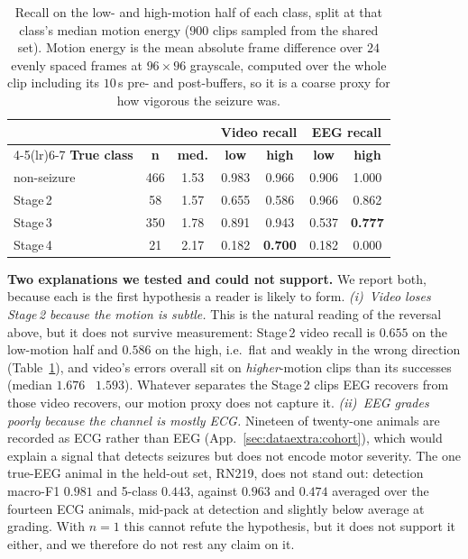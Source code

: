\begin{table}[tb]
\centering
\caption{Recall on the low- and high-motion half of each class, split at that class's
median motion energy ($900$ clips sampled from the shared set). Motion energy is the
mean absolute frame difference over $24$ evenly spaced frames at $96\times96$
grayscale, computed over the whole clip including its $10$\,s pre- and post-buffers,
so it is a coarse proxy for how vigorous the seizure was.}
\label{tab:motion}
\setlength{\tabcolsep}{4pt}
\renewcommand{\arraystretch}{1.15}
\begin{tabular}{@{}l c c cc cc@{}}
\toprule
 & & & \multicolumn{2}{c}{\textbf{Video recall}} & \multicolumn{2}{c}{\textbf{EEG recall}} \\
\cmidrule(lr){4-5}\cmidrule(lr){6-7}
\textbf{True class} & \textbf{n} & \textbf{med.} & \textbf{low} & \textbf{high} & \textbf{low} & \textbf{high} \\
\midrule
non-seizure & 466 & 1.53 & 0.983 & 0.966 & 0.906 & 1.000 \\
Stage\,2    &  58 & 1.57 & 0.655 & 0.586 & 0.966 & 0.862 \\
Stage\,3    & 350 & 1.78 & 0.891 & 0.943 & 0.537 & \textbf{0.777} \\
Stage\,4    &  21 & 2.17 & 0.182 & \textbf{0.700} & 0.182 & 0.000 \\
\bottomrule
\end{tabular}
\end{table}

\noindent\textbf{Two explanations we tested and could not support.}
We report both, because each is the first hypothesis a reader is likely to form. \emph{(i)~Video loses Stage\,2 because the motion is subtle.} This is the natural
reading of the reversal above, but it does not survive measurement: Stage\,2 video
recall is $0.655$ on the low-motion half and $0.586$ on the high, i.e.\ flat and
weakly in the wrong direction (Table~\ref{tab:motion}), and video's errors overall
sit on \emph{higher}-motion clips than its successes (median $1.676$ \vs\ $1.593$). Whatever separates the Stage\,2 clips EEG recovers from those video recovers, our
motion proxy does not capture it. \emph{(ii)~EEG grades poorly because the channel is
mostly ECG.} Nineteen of twenty-one animals are recorded as ECG rather than EEG
(App.~\ref{sec:dataextra:cohort}), which would explain a signal that detects seizures
but does not encode motor severity. The one true-EEG animal in the held-out set,
RN219, does not stand out: detection macro-F1 $0.981$ and 5-class $0.443$, against
$0.963$ and $0.474$ averaged over the fourteen ECG animals, mid-pack at detection and
slightly below average at grading. With $n{=}1$ this cannot refute the hypothesis, but
it does not support it either, and we therefore do not rest any claim on it.

